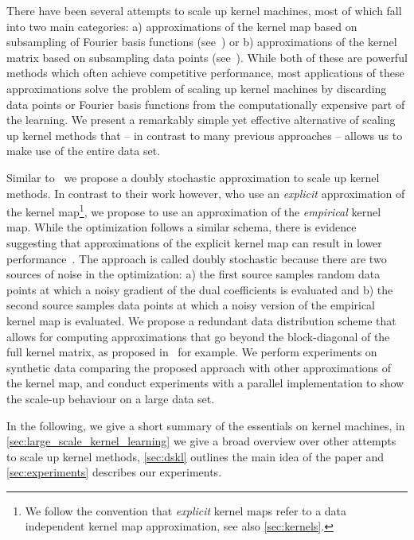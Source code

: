 \documentclass{article} %
\begin{document}
There have been several attempts to scale up kernel machines, most of which fall into two main categories: a) approximations of the kernel map based on subsampling of Fourier basis functions (see~\cite{Rahimi2008}) or b) approximations of the kernel matrix based on subsampling data points (see~\cite{Williams2000}).
%
While both of these are powerful methods which often achieve competitive performance, most applications of these approximations solve the problem of scaling up kernel machines by discarding data points or Fourier basis functions from the computationally expensive part of the learning. We present a remarkably simple yet effective alternative of scaling up kernel methods that -- in contrast to many previous approaches -- allows us to make use of the entire data set. 

Similar to~\cite{Dai2014} we propose a doubly stochastic approximation to scale up kernel methods. In contrast to their work however, who use an {\em explicit} approximation of the kernel map\footnote{We follow the convention that {\em explicit} kernel maps refer to a data independent kernel map approximation, see also \autoref{sec:kernels}.}, we propose to use an approximation of the {\em empirical} kernel map. While the optimization follows a similar schema, there is evidence suggesting that approximations of the explicit kernel map can result in lower performance~\cite{Yang2012}.
%
The approach is called doubly stochastic because there are two sources of noise in the optimization: a) the first source samples random data points at which a noisy gradient of the dual coefficients is evaluated and b) the second source samples data points at which a noisy version of the empirical kernel map is evaluated. We propose a redundant data distribution scheme that allows for computing approximations that go beyond the block-diagonal of the full kernel matrix, as proposed in~\cite{Deisenroth2015} for example. We perform experiments on synthetic data comparing the proposed approach with other approximations of the kernel map, and conduct experiments with a parallel implementation to show the scale-up behaviour on a large data set. 

In the following, we give a short summary of the essentials on kernel machines, in \autoref{sec:large_scale_kernel_learning} we give a broad overview over other attempts to scale up kernel methods, \autoref{sec:dskl} outlines the main idea of the paper and \autoref{sec:experiments} describes our experiments.
\end{document}
